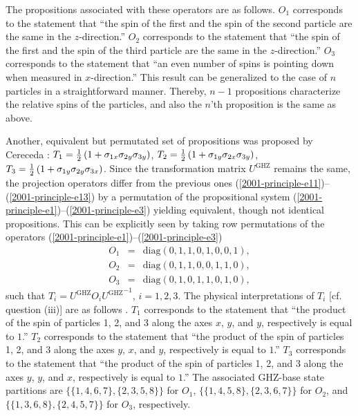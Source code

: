 The propositions associated with these operators are as follows.
$O_1$ corresponds to the statement that
``the  spin of the first and the  spin of the second particle are the same in the
$z$-direction.''
$O_2$ corresponds to the statement that
``the  spin of the first and the  spin of the third particle are the same in the
$z$-direction.''
$O_3$  corresponds to the statement that
``an even number of spins
is pointing down when measured in $x$-direction.''
This result can be generalized to the case of $n$ particles in a straightforward manner.
Thereby, $n-1$ propositions characterize the relative spins of the particles,
and also the $n$'th proposition is the same as above.



Another, equivalent but permutated set of propositions was proposed by
Cereceda \cite{Cereceda,mermin}:
$
T_1={1\over2}\left(1+\sigma_{1x}\sigma_{2y}\sigma_{3y}\right)
$, $
T_2={1\over2}\left(1+\sigma_{1y}\sigma_{2x}\sigma_{3y}\right)
$, $
T_3={1\over2}\left(1+\sigma_{1y}\sigma_{2y}\sigma_{3x}\right)
$.
Since the transformation matrix $U^{\textrm{GHZ}}$ remains the same,
the projection operators differ from the previous ones
(\ref{2001-principle-e11})--(\ref{2001-principle-e13})
by a permutation of the propositional system
(\ref{2001-principle-e1})--(\ref{2001-principle-e3})
yielding equivalent, though not identical propositions.
This can be explicitly seen by taking row permutations of the operators
(\ref{2001-principle-e1})--(\ref{2001-principle-e3})
\begin{eqnarray}
O_1&=&\textrm{diag}\left(0,1,1,0,1,0,0,1\right), \label{2001-principle-e1c}\\
O_2&=&\textrm{diag}\left(0,1,1,0,0,1,1,0\right),  \\
O_3&=&\textrm{diag}\left(0,1,0,1,1,0,1,0\right), \label{2001-principle-e3c}
\end{eqnarray}
such that $T_i=U^{\textrm{GHZ}} O_i {U^{\textrm{GHZ}}}^{-1}$, $i=1,2,3$.
The physical interpretations of $T_i$  [cf. question (iii)] are
as follows \cite{Cereceda}.
$T_1$ corresponds to the statement that
``the product of the spin of particles 1, 2, and 3 along the axes $x$, $y$, and $y$, respectively is equal to $1$.''
$T_2$ corresponds to the statement that
``the product of the spin of particles 1, 2, and 3 along the axes $y$, $x$, and $y$, respectively is equal to $1$.''
$T_3$  corresponds to the statement that
``the product of the spin of particles 1, 2, and 3 along the axes $y$, $y$, and $x$, respectively is equal to $1$.''
The associated GHZ-base state partitions are
$\{
\{1 ,4 ,6 , 7 \},
\{2 ,3 ,5 , 8 \}
\}$ for $O_1$,
$\{
\{1 ,4 ,5 , 8 \},
\{2 ,3 ,6 , 7 \}
\}$ for $O_2$, and
$\{
\{1 ,3 ,6 , 8 \},
\{2 ,4 ,5 , 7 \}
\}$ for $O_3$, respectively.


